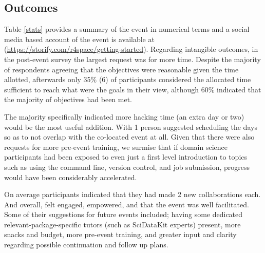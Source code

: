 \documentclass[conference]{IEEEtran}
\begin{document}
\subsection{Outcomes}
Table \ref{stats} provides a summary of the event in numerical terms and a social media based account of the event is available at \cite{noauthor_undated-az} (\url{https://storify.com/r4space/getting-started}).  Regarding intangible outcomes, in the post-event survey the largest request was for more time.  Despite the majority of respondents agreeing that the objectives were reasonable given the time allotted, afterwards only 35\% (6) of participants considered the allocated time sufficient to reach what were the goals in their view, although 60\% indicated that the majority of objectives had been met.  

The majority specifically indicated more hacking time (an extra day or two) would be the most useful addition.  With 1 person suggested scheduling the days so as to not overlap with the co-located event at all.  Given that there were also requests for more pre-event training, we surmise that if domain science participants had been exposed to even just a first level introduction to topics such as using the command line, version control, and job submission, progress would have been considerably accelerated.

On average participants indicated that they had made 2 new collaborations each.  And overall,  felt engaged, empowered, and that the event was well facilitated.  Some of their suggestions for future events included; having some dedicated relevant-package-specific tutors (such as SciDataKit experts) present, more snacks and budget, more pre-event training, and greater input and clarity regarding possible continuation and follow up plans.



\end{document}
